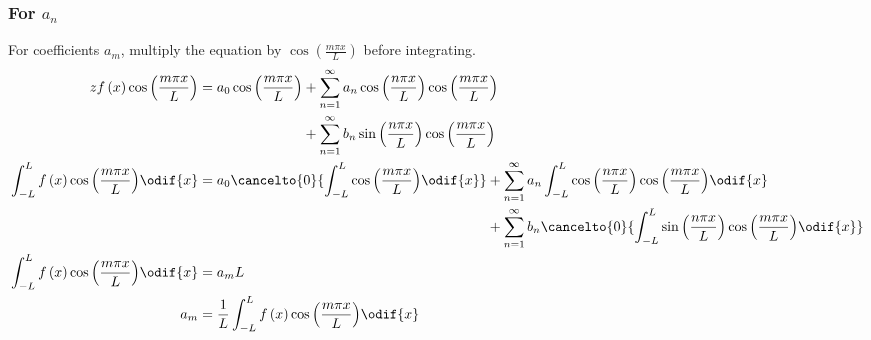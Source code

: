 \documentclass{article}
\begin{document}
\subsubsection{For \texorpdfstring{\(a_n\)}{an}}
For coefficients \(a_m\), multiply the equation by \(\cos{\left( \frac{m \pi x}{L} \right)}\) before integrating.
\begin{align*}z
    f\left( x \right) \cos{\left( \frac{m \pi x}{L} \right)}                      & = \begin{aligned}[t]
                                                                                          a_0 \cos{\left( \frac{m \pi x}{L} \right)} & + \sum_{n = 1}^\infty a_n \cos{\left( \frac{n \pi x}{L} \right)} \cos{\left( \frac{m \pi x}{L} \right)} \\
                                                                                                                                     & + \sum_{n = 1}^\infty b_n \sin{\left( \frac{n \pi x}{L} \right)} \cos{\left( \frac{m \pi x}{L} \right)}
                                                                                      \end{aligned}                                                                                        \\
    \int_{-L}^L f\left( x \right) \cos{\left( \frac{m \pi x}{L} \right)} \odif{x} & = \begin{aligned}[t]
                                                                                          a_0 \cancelto{0}{\int_{-L}^L \cos{\left( \frac{m \pi x}{L} \right)} \odif{x}} & + \sum_{n = 1}^\infty a_n \int_{-L}^L \cos{\left( \frac{n \pi x}{L} \right)} \cos{\left( \frac{m \pi x}{L} \right)} \odif{x}               \\
                                                                                                                                                                        & + \sum_{n = 1}^\infty b_n \cancelto{0}{\int_{-L}^L \sin{\left( \frac{n \pi x}{L} \right)} \cos{\left( \frac{m \pi x}{L} \right)} \odif{x}}
                                                                                      \end{aligned} \\
    \int_{-L}^L f\left( x \right) \cos{\left( \frac{m \pi x}{L} \right)} \odif{x} & = a_m L                                                                                                                                                                                                                     \\
    a_m                                                                           & = \frac{1}{L} \int_{-L}^L f\left( x \right) \cos{\left( \frac{m \pi x}{L} \right)} \odif{x}
\end{align*}
\end{document}
